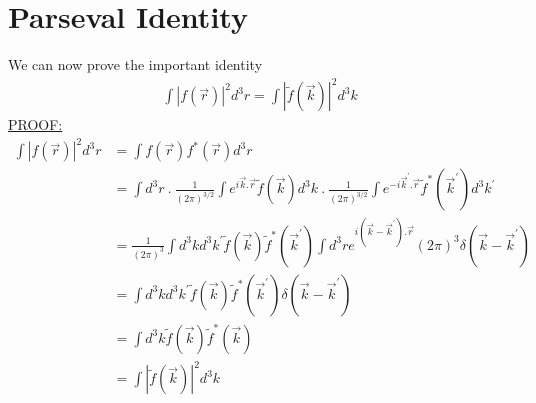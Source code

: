\section*{Parseval Identity}
We can now prove the important identity
\begin{align*}
\int |f(\vec{r})|^2 d^3r = \int |\tilde{f}(\vec{k})|^2 d^3k
\end{align*}
\underline{PROOF:}
\begin{align*}
\int |f(\vec{r})|^2 d^3r &= \int f(\vec{r}) f^*(\vec{r}) d^3r \\
&= \int d^3r \ .\ \frac{1}{(2\pi)^{3/2}} \int e^{i \vec{k}.\vec{r}} \tilde{f} (\vec{k}) d^3k \ .\ \frac{1}{(2\pi)^{3/2}} \int e^{-i \vec{k}^\prime.\vec{r}} \tilde{f}^* (\vec{k}^\prime) d^3k^\prime \\
&= \frac{1}{(2\pi)^3} \int d^3k d^3k^\prime \tilde{f} (\vec{k}) \tilde{f}^* (\vec{k}^\prime) \int d^3r e^{i (\vec{k} - \vec{k}^\prime) . \vec{r}} (2\pi)^3 \delta (\vec{k} - \vec{k}^\prime) \\
&= \int d^3k d^3k^\prime \tilde{f} (\vec{k}) \tilde{f}^* (\vec{k}^\prime) \delta (\vec{k} - \vec{k}^\prime) \\
&= \int d^3k \tilde{f} (\vec{k}) \tilde{f}^* (\vec{k}) \\
&= \int |\tilde{f} (\vec{k})|^2  d^3k  \\
\end{align*}



